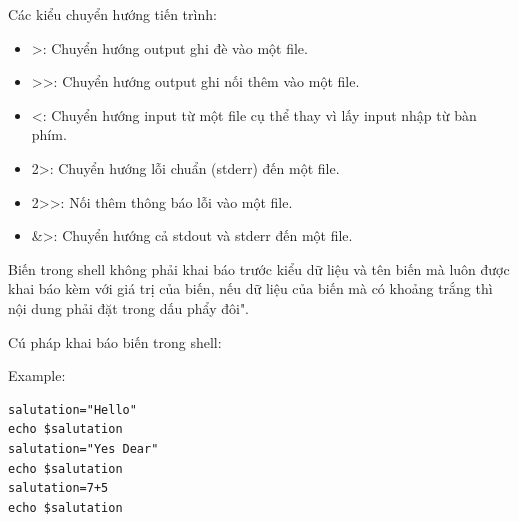 \documentclass[12pt,a4paper]{article}
\begin{document}
	\par Các kiểu chuyển hướng tiến trình:
	\begin{itemize}
		\item >: Chuyển hướng output ghi đè vào một file.
		\item >>: Chuyển hướng output ghi nối thêm vào một file.
		\item <: Chuyển hướng input từ một file cụ thể thay vì lấy input nhập từ bàn phím.
		\item 2>: Chuyển hướng lỗi chuẩn (stderr) đến một file.
		\item 2>>: Nối thêm thông báo lỗi vào một file.
		\item \&>: Chuyển hướng cả stdout và stderr đến một file.
	\end{itemize}
	\par Biến trong shell không phải khai báo trước kiểu dữ liệu và tên biến mà luôn được khai báo kèm với giá trị của biến, nếu dữ liệu của biến mà có khoảng trắng thì nội dung phải đặt trong dấu phẩy đôi".
	\par Cú pháp khai báo biến trong shell:
	\begin{center}
	\end{center}
	\par Example:
\begin{lstlisting}
salutation="Hello"
echo $salutation
salutation="Yes Dear"
echo $salutation
salutation=7+5
echo $salutation
\end{lstlisting}
\end{document}
